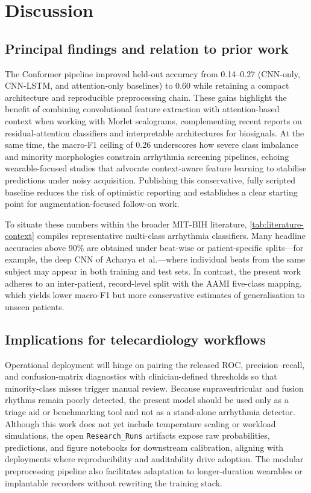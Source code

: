 \section{Discussion}
\subsection{Principal findings and relation to prior work}
The Conformer pipeline improved held-out accuracy from 0.14--0.27 (CNN-only, CNN-LSTM, and attention-only baselines) to 0.60 while retaining a compact architecture and reproducible preprocessing chain. These gains highlight the benefit of combining convolutional feature extraction with attention-based context when working with Morlet scalograms, complementing recent reports on residual-attention classifiers and interpretable architectures for biosignals.\cite{rahman2024residual,rowlandson2024bridging} At the same time, the macro-F1 ceiling of 0.26 underscores how severe class imbalance and minority morphologies constrain arrhythmia screening pipelines, echoing wearable-focused studies that advocate context-aware feature learning to stabilise predictions under noisy acquisition.\cite{thapa2025generalizable,tison2018passive} Publishing this conservative, fully scripted baseline reduces the risk of optimistic reporting and establishes a clear starting point for augmentation-focused follow-on work.

To situate these numbers within the broader MIT-BIH literature, \autoref{tab:literature-context} compiles representative multi-class arrhythmia classifiers. Many headline accuracies above 90\% are obtained under beat-wise or patient-specific splits---for example, the deep CNN of Acharya et al.\cite{acharya2017deep}---where individual beats from the same subject may appear in both training and test sets. In contrast, the present work adheres to an inter-patient, record-level split with the AAMI five-class mapping, which yields lower macro-F1 but more conservative estimates of generalisation to unseen patients.

\subsection{Implications for telecardiology workflows}
Operational deployment will hinge on pairing the released ROC, precision--recall, and confusion-matrix diagnostics with clinician-defined thresholds so that minority-class misses trigger manual review. Because supraventricular and fusion rhythms remain poorly detected, the present model should be used only as a triage aid or benchmarking tool and not as a stand-alone arrhythmia detector. Although this work does not yet include temperature scaling or workload simulations, the open \texttt{Research\_Runs} artifacts expose raw probabilities, predictions, and figure notebooks for downstream calibration, aligning with deployments where reproducibility and auditability drive adoption.\cite{rowlandson2024bridging,spagna2024telecardiology,tison2018passive} The modular preprocessing pipeline also facilitates adaptation to longer-duration wearables or implantable recorders without rewriting the training stack.

